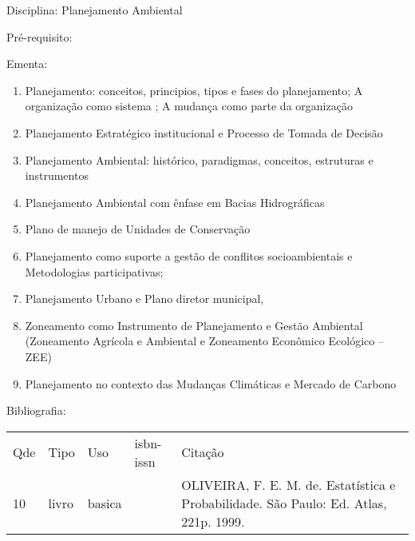 \documentclass[12pt,a4paper,twoside]{report}
\begin{document}
Disciplina: Planejamento Ambiental

Pré-requisito:
\begin{enumerate}
\end{enumerate}

Ementa:
\begin{enumerate}
\item Planejamento: conceitos, principios, tipos e fases do planejamento; A organização como sistema ; A mudança como parte da organização
\item Planejamento Estratégico institucional e Processo de Tomada de Decisão
\item Planejamento Ambiental: histórico, paradigmas, conceitos, estruturas e instrumentos
\item Planejamento Ambiental com ênfase em Bacias Hidrográficas
\item Plano de manejo de Unidades de Conservação
\item Planejamento como suporte a gestão de conflitos socioambientais e Metodologias participativas;
\item Planejamento Urbano e Plano diretor municipal,
\item Zoneamento como Instrumento de Planejamento e Gestão Ambiental (Zoneamento Agrícola e Ambiental e  Zoneamento Econômico Ecológico – ZEE)
\item Planejamento no contexto das Mudanças Climáticas e Mercado de Carbono
\end{enumerate}

Bibliografia:
\begin{tabular}{lllll}
Qde & Tipo & Uso & isbn-issn & Citação \\
10&livro&basica&&OLIVEIRA, F. E. M. de. Estatística e Probabilidade. São Paulo: Ed. Atlas, 221p. 1999.\\
\end{tabular}
\end{document}
